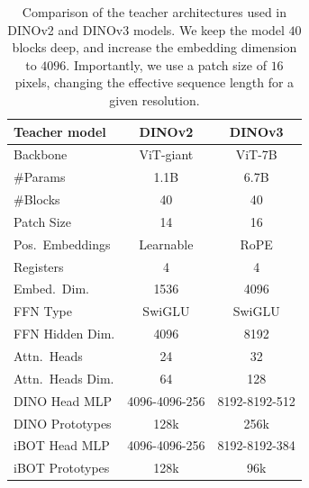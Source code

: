 \begin{table}[t]
    \centering
    \small
    \caption{
      Comparison of the teacher architectures used in DINOv2 and DINOv3 models.
      We keep the model $40$ blocks deep, and increase the embedding dimension to $4096$.
      Importantly, we use a patch size of $16$ pixels, changing the effective sequence length for a given resolution.
    }
    \begin{tabular}{l cc}
        \toprule
        Teacher model & DINOv2 & DINOv3 \\
        \midrule
        Backbone & ViT-giant & ViT-7B \\
        \#Params & 1.1B & 6.7B \\
        \#Blocks & 40 & 40 \\
        Patch Size & 14 & 16 \\
        Pos.~Embeddings & Learnable & RoPE \\
        Registers & 4 & 4 \\
        Embed.~Dim. & 1536 & 4096 \\
        FFN Type & SwiGLU & SwiGLU \\
        FFN Hidden Dim. & 4096 & 8192 \\
        Attn.~Heads & 24 & 32 \\
        Attn.~Heads Dim. & 64 & 128 \\
        \midrule
        DINO Head MLP & 4096-4096-256 & 8192-8192-512 \\
        DINO Prototypes & 128k & 256k \\
        iBOT Head MLP & 4096-4096-256 & 8192-8192-384 \\
        iBOT Prototypes & 128k & 96k \\
        \bottomrule
    \end{tabular}
    \label{tab:models_comparison}
    \vspace{-0.5em}
\end{table}

